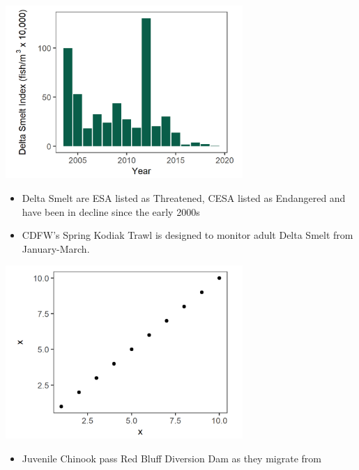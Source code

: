 \documentclass[]{article}\usepackage[]{graphicx}\usepackage[]{color}
\begin{document}
\begin{Row}
  \begin{Cell}{1}
    {\large 
      \begin{center}
        \includegraphics[width=9cm,align=m]{figures/smelt/skt_dsm_fig.png}
        \begin{itemize}[leftmargin=1.5cm,rightmargin=1cm,topsep=10pt]
          \item Delta Smelt are ESA listed as Threatened, CESA listed as Endangered and 
          have been in decline since the early 2000s
          \item CDFW's Spring Kodiak Trawl is designed to monitor adult Delta Smelt 
          from January-March.
        \end{itemize}
      \end{center}
    }
  \end{Cell}
  \begin{Cell}{1}
    {\large 
      \begin{center}
        \includegraphics[width=9cm,align=m]{figures/smelt/placeholder_fig.png}
        \begin{itemize}[leftmargin=1.5cm,rightmargin=1cm,topsep=10pt]
          \item Juvenile Chinook pass Red Bluff Diversion Dam as they migrate from 

\end{itemize}
\end{center}}
\end{Cell}
\end{Row}
\end{document}
